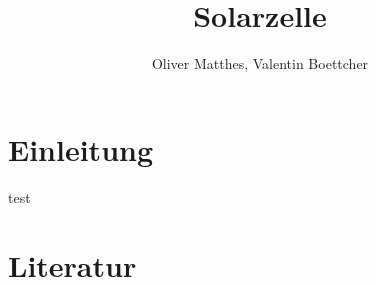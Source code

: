 \documentclass[slug=SZ, room=Hermann-Krone-Bau\,\ Labor\ 1.25, supervisor=Tim\ Ziegler]{../../Lab_Report_LaTeX/lab_report}
\title{Solarzelle}
\author{Oliver Matthes, Valentin Boettcher}
\begin{document}
\maketitle

\section{Einleitung}
\label{sec:einl}

test

\section{Literatur}
\label{sec:literatur}

\printbibliography
\end{document}
